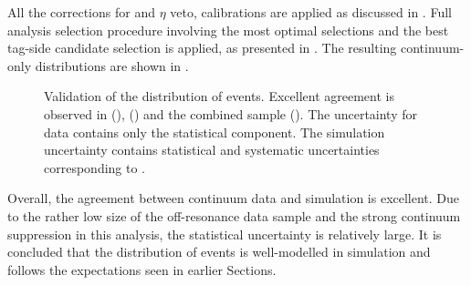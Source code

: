All the corrections for \piz and $\eta$ veto, \FEI calibrations are applied as discussed in .
Full analysis selection procedure involving the most optimal selections and the best tag-side candidate selection is applied, as presented in .
The resulting continuum-only \EB distributions are shown in .
\begin{figure}[htbp!]
    \caption{\label{fig:offresonance_validation} Validation of the \EB distribution of \epem\ra\qqbar events.
    Excellent agreement is observed in \feiBp (), \feiBz ()
    and the combined sample ().
    The uncertainty for data contains only the statistical component.
    The simulation uncertainty contains statistical and systematic uncertainties corresponding to .
    }
\end{figure}

Overall, the agreement between continuum data and simulation is excellent.
Due to the rather low size of the off-resonance data sample and the strong continuum suppression in this analysis, the statistical uncertainty is relatively large.
It is concluded that the \EB distribution of \epem\ra\qqbar events is well-modelled in simulation and follows the expectations seen in earlier Sections.

